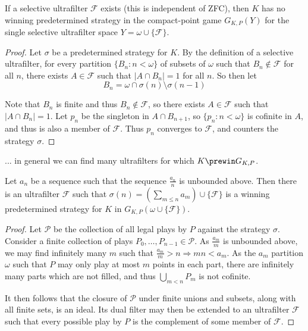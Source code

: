 \begin{prop}
If a selective ultrafilter $\mathcal{F}$ exists (this is independent of ZFC), then $K$ has no winning predetermined strategy in the compact-point game $G_{K,P}(Y)$ for the single selective ultrafilter space $Y=\omega \cup \{\mathcal{F}\}$.
\end{prop}

\begin{proof}
Let $\sigma$ be a predetermined strategy for $K$. By the definition of a selective ultrafilter, for every partition $\{B_n : n < \omega\}$ of subsets of $\omega$ such that $B_n \not\in \mathcal{F}$ for all $n$, there exists $A \in \mathcal{F}$ such that $|A \cap B_n|=1$ for all $n$. So then let \[B_n = \omega \cap \sigma(n) \setminus \sigma(n-1)\]

Note that $B_n$ is finite and thus $B_n \not\in \mathcal{F}$, so there exists $A\in \mathcal{F}$ such that $|A \cap B_n|=1$. Let $p_n$ be the singleton in $A \cap B_{n+1}$, so $\{p_n : n < \omega\}$ is cofinite in $A$, and thus is also a member of $\mathcal{F}$. Thus $p_n$ converges to $\mathcal{F}$, and counters the strategy $\sigma$.
\end{proof}

... in general we can find many ultrafilters for which $K\prewin G_{K,P}$.

\begin{thm}
Let $a_n$ be a sequence such that the sequence $\frac{a_n}{n}$ is unbounded above. Then there is an ultrafilter $\mathcal{F}$ such that $\sigma(n)=(\sum_{m\leq n} a_m )\cup \{\mathcal{F}\}$ is a winning predetermined strategy for $K$ in $G_{K,P}(\omega\cup\{\mathcal{F}\})$.
\end{thm}

\begin{proof}
Let $\mathcal{P}$ be the collection of all legal plays by $P$ against the strategy $\sigma$. Consider a finite collection of plays $P_0,\dots,P_{n-1}\in \mathcal{P}$. As $\frac{a_m}{m}$ is unbounded above, we may find infinitely many $m$ such that $\frac{a_m}{m}>n \Rightarrow mn<a_m$. As the $a_m$ partition $\omega$ such that $P$ may only play at most $m$ points in each part, there are infinitely many parts which are not filled, and thus $\bigcup_{m<n} P_m$ is not cofinite.

It then follows that the closure of $\mathcal{P}$ under finite unions and subsets, along with all finite sets, is an ideal. Its dual filter may then be extended to an ultrafilter $\mathcal{F}$ such that every possible play by $P$ is the complement of some member of $\mathcal{F}$.
\end{proof}

